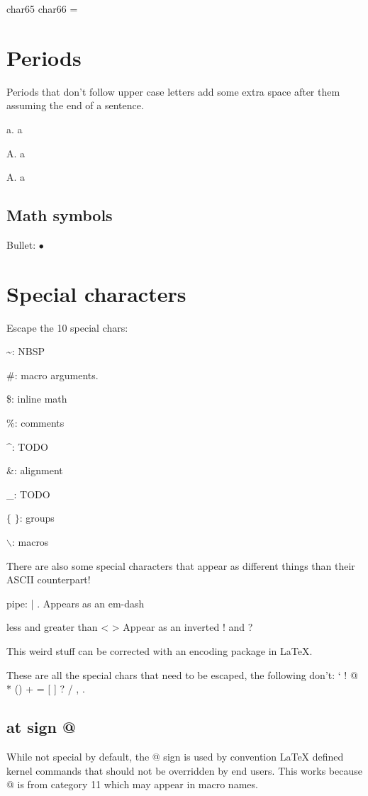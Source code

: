   char65 char66 = {}{}

  \section{Periods}

  Periods that don't follow upper case letters add some extra space after them assuming the end of a sentence.

  a. a

  A. a

  A\null. a

  \subsection{Math symbols}

    Bullet: $\bullet$

\section{Special characters}

  Escape the 10 special chars:

  \~{}: NBSP

  \#: macro arguments.

  \$: inline math

  \%: comments

  \^{}: TODO

  \&: alignment

  \_: TODO

  $\{$ $\}$: groups

  $\backslash$: macros

  There are also some special characters that appear as different things than their ASCII counterpart!

  \item{} pipe: | . Appears as an em-dash
  \item{} less and greater than < > Appear as an inverted ! and ?

  This weird stuff can be corrected with an encoding package in LaTeX.

  These are all the special chars that need to be escaped, the following don't: ` ! @ * () + = [  ] ? / , .

  \subsection{at sign @}

    While not special by default, the @ sign is used by convention LaTeX defined kernel commands that should not be overridden by end users. This works because @ is from category 11 which may appear in macro names.

